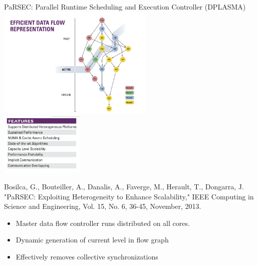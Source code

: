 \begin{frame}{PaRSEC: Parallel Runtime Scheduling and Execution
    Controller (DPLASMA)}
  \vspace{-.1cm}
  \hspace{2cm}\includegraphics[trim=0cm 0cm 0cm
  1cm,clip=true,width=7.5cm]{../common/pics/comm/PaRSEC1.png}
 \\[-3.4cm]
  \includegraphics[width=4cm]{../common/pics/comm/PaRSEC2.png}
  \hspace{5cm}{\tiny Graphic from icl.cs.utk.edu}
  \begin{block}
    {\tiny Bosilca, G., Bouteiller, A., Danalis, A., Faverge,
      M., Herault, T., Dongarra, J. "PaRSEC: Exploiting Heterogeneity
      to Enhance Scalability," IEEE Computing in Science and
      Engineering, Vol. 15, No. 6, 36-45, November, 2013.}
    \begin{itemize}
    \item Master data flow controller runs distributed on all cores.
    \item Dynamic generation of current level in flow graph
    \item Effectively removes collective synchronizations
    \end{itemize}
  \end{block}
\end{frame}
